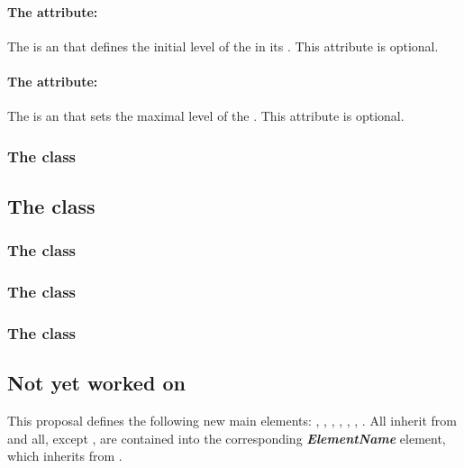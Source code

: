 \paragraph{The   attribute:}
The  is an  that defines the initial level of the  in its . This attribute is optional.

\paragraph{The  attribute:}
The  is an  that sets the maximal level of the . This attribute is optional.

\subsubsection{The  class}

\subsection{The  class}
\label{transitions-class}

\subsubsection{The  class}

\subsubsection{The  class}

\subsubsection{The  class}


\subsection{Not yet worked on}

This proposal defines the following new main elements: , , , , , , . All inherit from  and all, except , are contained into the corresponding \textbf{\emph{ElementName}} element, which inherits from .%

